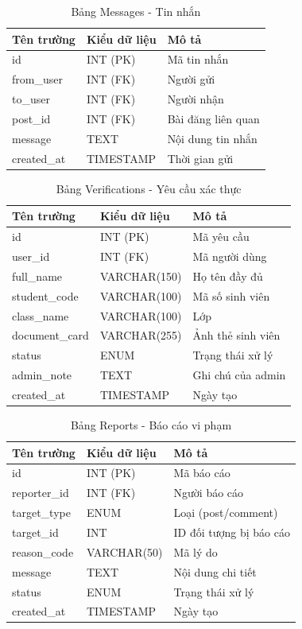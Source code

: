 \documentclass[a4paper,13pt]{extreport}
\begin{document}
\begin{table}[H]
\centering
\caption{Bảng Messages - Tin nhắn}
\begin{tabular}{|l|l|l|}
\hline
\textbf{Tên trường} & \textbf{Kiểu dữ liệu} & \textbf{Mô tả} \\
\hline
id & INT (PK) & Mã tin nhắn \\
from\_user & INT (FK) & Người gửi \\
to\_user & INT (FK) & Người nhận \\
post\_id & INT (FK) & Bài đăng liên quan \\
message & TEXT & Nội dung tin nhắn \\
created\_at & TIMESTAMP & Thời gian gửi \\
\hline
\end{tabular}
\end{table}

\begin{table}[H]
\centering
\caption{Bảng Verifications - Yêu cầu xác thực}
\begin{tabular}{|l|l|l|}
\hline
\textbf{Tên trường} & \textbf{Kiểu dữ liệu} & \textbf{Mô tả} \\
\hline
id & INT (PK) & Mã yêu cầu \\
user\_id & INT (FK) & Mã người dùng \\
full\_name & VARCHAR(150) & Họ tên đầy đủ \\
student\_code & VARCHAR(100) & Mã số sinh viên \\
class\_name & VARCHAR(100) & Lớp \\
document\_card & VARCHAR(255) & Ảnh thẻ sinh viên \\
status & ENUM & Trạng thái xử lý \\
admin\_note & TEXT & Ghi chú của admin \\
created\_at & TIMESTAMP & Ngày tạo \\
\hline
\end{tabular}
\end{table}

\begin{table}[H]
\centering
\caption{Bảng Reports - Báo cáo vi phạm}
\begin{tabular}{|l|l|l|}
\hline
\textbf{Tên trường} & \textbf{Kiểu dữ liệu} & \textbf{Mô tả} \\
\hline
id & INT (PK) & Mã báo cáo \\
reporter\_id & INT (FK) & Người báo cáo \\
target\_type & ENUM & Loại (post/comment) \\
target\_id & INT & ID đối tượng bị báo cáo \\
reason\_code & VARCHAR(50) & Mã lý do \\
message & TEXT & Nội dung chi tiết \\
status & ENUM & Trạng thái xử lý \\
created\_at & TIMESTAMP & Ngày tạo \\
\hline
\end{tabular}
\end{table}
\end{document}
